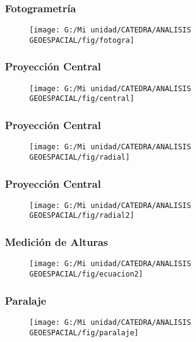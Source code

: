 \documentclass[14pt]{beamer}
\begin{document}
\begin{frame}
\frametitle{Fotogrametría} 
 \begin{figure}
    \centering
    \texttt{[image: G:/Mi unidad/CATEDRA/ANALISIS GEOESPACIAL/fig/fotogra]}
  \end{figure}
\end{frame}
\begin{frame}
\frametitle{Proyección Central} 
 \begin{figure}
    \centering
    \texttt{[image: G:/Mi unidad/CATEDRA/ANALISIS GEOESPACIAL/fig/central]}
  \end{figure}
\end{frame}
\begin{frame}
\frametitle{Proyección Central} 
 \begin{figure}
    \centering
    \texttt{[image: G:/Mi unidad/CATEDRA/ANALISIS GEOESPACIAL/fig/radial]}
  \end{figure}
\end{frame}
\begin{frame}
\frametitle{Proyección Central} 
 \begin{figure}
    \centering
    \texttt{[image: G:/Mi unidad/CATEDRA/ANALISIS GEOESPACIAL/fig/radial2]}
  \end{figure}
\end{frame}
\begin{frame}
\frametitle{Medición de Alturas} 
 \begin{figure}
    \centering
    \texttt{[image: G:/Mi unidad/CATEDRA/ANALISIS GEOESPACIAL/fig/ecuacion2]}
  \end{figure}
\end{frame}
\begin{frame}
\frametitle{Paralaje}
 \begin{figure}
    \centering
    \texttt{[image: G:/Mi unidad/CATEDRA/ANALISIS GEOESPACIAL/fig/paralaje]}
  \end{figure}
\end{frame}
\end{document}
